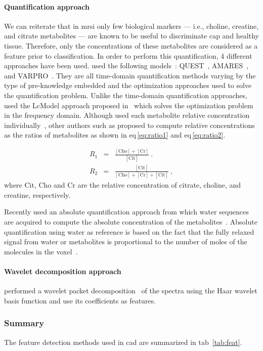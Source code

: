 \paragraph{Quantification approach}
We can reiterate that in \ac{mrsi} only few biological markers --- i.e., choline, creatine, and citrate metabolites --- are known to be useful to discriminate \ac{cap} and healthy tissue.
Therefore, only the concentrations of these metabolites are considered as a feature prior to classification.
In order to perform this quantification, 4 different approaches have been used.
\citeauthor{Kelm2007} used the following models~\cite{Kelm2007}: QUEST~\cite{Ratiney2005}, AMARES~\cite{Vanhamme1997}, and VARPRO~\cite{Coleman1993}.
They are all time-domain quantification methods varying by the type of pre-knowledge embedded and the optimization approaches used to solve the quantification problem.
Unlike the time-domain quantification approaches, \citeauthor{Parfait2012} used the LcModel approach proposed in~\cite{Provencher1993} which solves the optimization problem in the frequency domain.
Although \citeauthor{Parfait2012} used each metabolite relative concentration individually~\cite{Parfait2012}, other authors such as \citeauthor{Kelm2007} proposed to compute relative concentrations as the ratios of metabolites as shown in \acs{eq}\,\ref{eq:ratio1} and \acs{eq}\,\ref{eq:ratio2}.

\begin{eqnarray}
	R_1 & = & \frac{ [ \text{Cho} ] + [ \text{Cr} ]}{[ \text{Cit} ]} \ . \label{eq:ratio1} \\
	R_2 & = & \frac{[ \text{Cit} ]}{[\text{Cho}]+[\text{Cr}]+[\text{Cit}]} \ , \label{eq:ratio2}
\end{eqnarray}
\noindent where $\text{Cit}$, $\text{Cho}$ and $\text{Cr}$ are the relative concentration of citrate, choline, and creatine, respectively.

Recently \citeauthor{trigui2017automatic} used an absolute quantification approach from which water sequences are acquired to compute the absolute concentration of the metabolites~\cite{trigui2016classification,trigui2017automatic}.
Absolute quantification using water as reference is based on the fact that the fully relaxed signal from water or metabolites is proportional to the number of moles of the molecules in the voxel~\cite{gasparovic2006use}.

\paragraph{Wavelet decomposition approach} 
\citeauthor{Tiwari2012} performed a wavelet packet decomposition~\cite{Coifman1992} of the spectra using the Haar wavelet basis function and use its coefficients as features.

\subsubsection{Summary}

The feature detection methods used in \ac{cad} are summarized in \acs{tab}~\ref{tab:feat}.  

